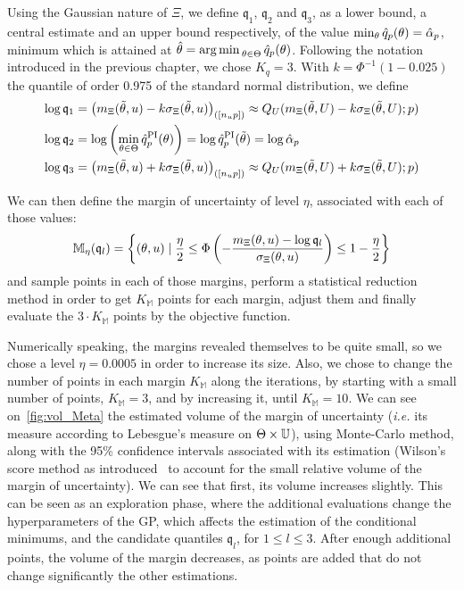 \documentclass[../../Main_ManuscritThese.tex]{subfiles}
\begin{document}
Using the Gaussian nature of $\Xi$, we define $\mathfrak{q}_1$,
$\mathfrak{q}_2$ and $\mathfrak{q}_3$, as a lower bound, a central
estimate and an upper bound respectively, of the value
$\min_\theta \hat{q}_p(\theta)=\hat{\alpha}_p$, minimum which is attained at
$\hat{\theta}= \operatorname*{arg\,min \,}_{\theta\in\Theta} \hat{q}_p(\theta)$. Following the
notation introduced in the previous chapter, we chose $K_q = 3$.
With $k=\Phi^{-1}(1 - 0.025)$ the quantile of order \num{0.975} of the
standard normal distribution, we define
\begin{align}
  \log {\mathfrak{q}}_1 &= \left(m_{\Xi}(\tilde{\theta}, u) - k \sigma_{\Xi}(\tilde{\theta}, u)\right)_{([n_{u}p])} \approx Q_U(m_{\Xi}(\tilde{\theta}, U) - k \sigma_{\Xi}(\tilde{\theta}, U); p) \\
  \log \mathfrak{q}_2 &= \log \left(\min_{\theta\in\Theta}\hat{q}^{\mathrm{PI}}_p(\theta) \right) = \log \hat{q}^{\mathrm{PI}}_p(\tilde{\theta}) = \log \hat{\alpha}_p \\
  \log \mathfrak{q}_3 &= \left(m_{\Xi}(\tilde{\theta}, u) + k \sigma_{\Xi}(\tilde{\theta}, u)\right)_{([n_{u}p])} \approx Q_U(m_{\Xi}(\tilde{\theta}, U) + k \sigma_{\Xi}(\tilde{\theta}, U); p)
\end{align}

We can then define the margin of uncertainty of level $\eta$,
associated with each of those values:
\begin{equation}
  \mathbb{M}_{\eta}(\mathfrak{q}_l) = \left\{(\theta, u) \mid \frac{\eta}{2} \leq \Phi\left(-\frac{m_{\Xi}(\theta, u) - \log \mathfrak{q}_l}{\sigma_{\Xi}(\theta, u)}\right) \leq 1 - \frac{\eta}{2}\right\}
\end{equation}
and sample points in each of those margins, perform a statistical
reduction method in order to get $K_{\mathbb{M}}$ points for each
margin, adjust them and finally evaluate the $3\cdot K_{\mathbb{M}}$
points by the objective function.


Numerically speaking, the margins revealed themselves to be quite
small, so we chose a level $\eta=0.0005$ in order to increase its
size.  Also, we chose to change the number of points in each margin
$K_{\mathbb{M}}$ along the iterations, by starting with a small number
of points, $K_{\mathbb{M}}=3$, and by increasing it, until
$K_{\mathbb{M}}=10$. We can see on~\cref{fig:vol_Meta} the estimated
volume of the margin of uncertainty (\emph{i.e.} its measure according
to Lebesgue's measure on $\Theta \times \mathbb{U}$), using Monte-Carlo
method, along with the 95\% confidence intervals associated with its
estimation (Wilson's score method as introduced~\cite{wilson_probable_1927} to
account for the small relative volume of the margin of
uncertainty). We can see that first, its volume increases
slightly. This can be seen as an exploration phase, where the
additional evaluations change the hyperparameters of the GP, which
affects the estimation of the conditional minimums, and the candidate
quantiles $\mathfrak{q}_l$, for $1\leq l \leq 3$. After enough
additional points, the volume of the margin decreases, as points are
added that do not change significantly the other estimations.
\end{document}
